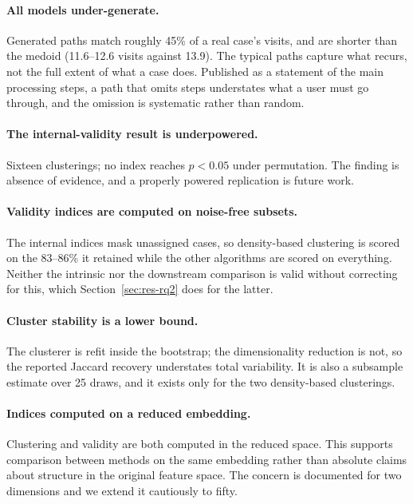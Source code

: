 \paragraph{All models under-generate.}
Generated paths match roughly 45\% of a real case's visits, and are shorter than the medoid
(11.6--12.6 visits against 13.9). The typical paths capture what recurs, not the full extent of
what a case does. Published as a statement of the main processing steps, a path that omits steps
understates what a user must go through, and the omission is systematic rather than random.

\paragraph{The internal-validity result is underpowered.}
Sixteen clusterings; no index reaches $p < 0.05$ under permutation. The finding is absence of
evidence, and a properly powered replication is future work.

\paragraph{Validity indices are computed on noise-free subsets.}
The internal indices mask unassigned cases, so density-based clustering is scored on the
83--86\% it retained while the other algorithms are scored on everything. Neither the intrinsic
nor the downstream comparison is valid without correcting for this, which
Section~\ref{sec:res-rq2} does for the latter.

\paragraph{Cluster stability is a lower bound.}
The clusterer is refit inside the bootstrap; the dimensionality reduction is not, so the
reported Jaccard recovery understates total variability. It is also a subsample estimate over
25 draws, and it exists only for the two density-based clusterings.

\paragraph{Indices computed on a reduced embedding.}
Clustering and validity are both computed in the reduced space. This supports comparison between
methods on the same embedding rather than absolute claims about structure in the original
feature space. The concern is documented for two dimensions and we extend it cautiously to
fifty.

